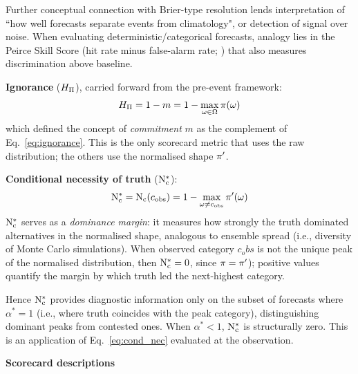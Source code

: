 Further conceptual connection with Brier-type
resolution lends interpretation of ``how well
forecasts separate events from climatology",
or detection of signal over noise.
When evaluating deterministic/categorical forecasts,
analogy lies in the Peirce Skill Score
(hit rate minus false-alarm rate;
\citealt{Wilks2011-vw}) that also measures
discrimination above baseline.

\textbf{Ignorance} ($H_{\Pi}$), carried forward from the pre-event
framework:
\begin{equation}
H_{\Pi} = 1 - m = 1 - \max_{\omega \in \Omega} \pi(\omega)
\end{equation}
which defined the concept of \textit{commitment} $m$
as the complement of Eq.~\ref{eq:ignorance}.
This is the only scorecard metric
that uses the raw distribution; the others use the normalised
shape $\pi'$.

\textbf{Conditional necessity of truth} ($\mathrm{N}_{\mathrm{c}}^*$):
\begin{equation}
\mathrm{N}_{\mathrm{c}}^* = \mathrm{N}_{\mathrm{c}}(c_{\mathrm{obs}})
    = 1 - \max_{\omega \neq c_{\mathrm{obs}}} \pi'(\omega)
\label{eq:nc_star}
\end{equation}
$\mathrm{N}_{\mathrm{c}}^*$ serves as a \textit{dominance margin}:
it measures how strongly the truth dominated
alternatives in the normalised shape,
analogous to ensemble spread (i.e., diversity of
Monte Carlo simulations).
When observed category $c_obs$ is not the unique
peak of the normalised distribution, then
$\mathrm{N}_{\mathrm{c}}^* = 0$, since $\pi = \pi'$);
positive values quantify the margin by which truth
led the next-highest category.

Hence $\mathrm{N}_{\mathrm{c}}^*$ provides diagnostic information only
on the subset of forecasts where $\alpha^* = 1$
(i.e., where truth coincides with the peak category),
distinguishing dominant peaks from contested ones.
When $\alpha^* < 1$, $\mathrm{N}_{\mathrm{c}}^*$ is structurally zero.
This is an application of
Eq.~\eqref{eq:cond_nec} evaluated at the observation.

\medskip
\noindent\textbf{\textsf{\color{rationalecolor}Scorecard descriptions}}
\smallskip

